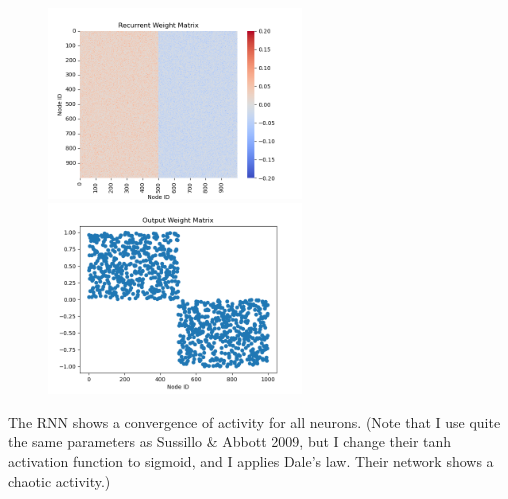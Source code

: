\documentclass[12pt, a4paper]{article}
\begin{document}
\begin{figure}[H]
    \centering
    \includegraphics[width=0.6\textwidth]{RNN/FORCE/fig/FORCE_nofb_rcweight.png} \\
    \includegraphics[width=0.6\textwidth]{RNN/FORCE/fig/FORCE_nofb_outweight.png} \\
\end{figure}

The RNN shows a convergence of activity for all neurons. (Note that I use quite the same parameters as Sussillo \& Abbott 2009, but I change their tanh activation function to sigmoid, and I applies Dale's law. Their network shows a chaotic activity.)
\end{document}
